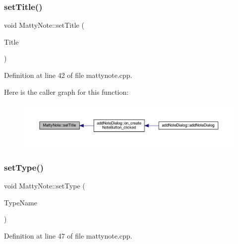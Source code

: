 \subsubsection{\texorpdfstring{set\+Title()}{setTitle()}}
{\footnotesize\ttfamily void Matty\+Note\+::set\+Title (\begin{DoxyParamCaption}\item[{const Q\+String \&}]{Title }\end{DoxyParamCaption})}



Definition at line 42 of file mattynote.\+cpp.

Here is the caller graph for this function\+:
\nopagebreak
\begin{figure}[H]
\begin{center}
\leavevmode
\includegraphics[width=350pt]{classMattyNote_af7909f64608b020b501019cf29796eb0_icgraph}
\end{center}
\end{figure}
\hypertarget{classMattyNote_ac9171fd4faaf0c286c9315a0b4ef4560}{}\label{classMattyNote_ac9171fd4faaf0c286c9315a0b4ef4560} 
\subsubsection{\texorpdfstring{set\+Type()}{setType()}\hspace{0.1cm}{\footnotesize\ttfamily [1/2]}}
{\footnotesize\ttfamily void Matty\+Note\+::set\+Type (\begin{DoxyParamCaption}\item[{const Q\+String \&}]{Type\+Name }\end{DoxyParamCaption})}



Definition at line 47 of file mattynote.\+cpp.

